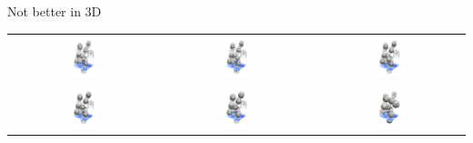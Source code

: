 \begin{frame}{Not better in 3D}
	\begin{center}
	\begin{tabular}{ccc}
	\includegraphics[width=0.18\textwidth]{comp3D_monoscale_r20_crop} & %
	\includegraphics[width=0.18\textwidth]{comp3D_monoscale_r25_crop} & %
	\includegraphics[width=0.18\textwidth]{comp3D_monoscale_r30_crop} \\ 
	\includegraphics[width=0.18\textwidth]{comp3D_monoscale_r35_crop} & %
	\includegraphics[width=0.18\textwidth]{comp3D_monoscale_r40_crop} & %
	\includegraphics[width=0.18\textwidth]{comp3D_monoscale_r45_crop} \\ 
	\end{tabular} 
	\end{center}
\end{frame}

